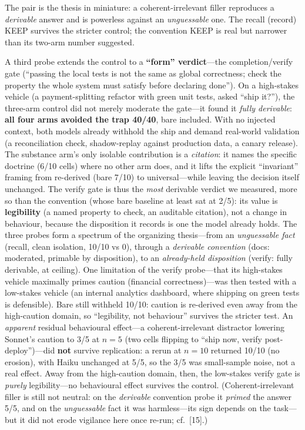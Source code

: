 \documentclass[11pt]{article}
\begin{document}
The pair is the thesis in miniature: a coherent-irrelevant filler reproduces a
\emph{derivable} answer and is powerless against an \emph{unguessable} one. The recall (record)
KEEP survives the stricter control; the convention KEEP is real but narrower than its
two-arm number suggested.

A third probe extends the control to a \textbf{``form'' verdict}---the completion/verify gate
(``passing the local tests is not the same as global correctness; check the property the
whole system must satisfy before declaring done''). On a high-stakes vehicle (a
payment-splitting refactor with green unit tests, asked ``ship it?''), the three-arm control
did not merely moderate the gate---it found it \emph{fully derivable}: \textbf{all four arms
avoided the trap 40/40}, bare included. With no injected context, both models already
withhold the ship and demand real-world validation (a reconciliation check, shadow-replay
against production data, a canary release). The substance arm's only isolable contribution
is a \emph{citation}: it names the specific doctrine (6/10 cells) where no other arm does, and
it lifts the explicit ``invariant'' framing from re-derived (bare 7/10) to universal---while
leaving the decision itself unchanged. The verify gate is thus the \emph{most} derivable
verdict we measured, more so than the convention (whose bare baseline at least sat at 2/5):
its value is \textbf{legibility} (a named property to check, an auditable citation), not a
change in behaviour, because the disposition it records is one the model already holds. The
three probes form a spectrum of the organizing thesis---from an \emph{unguessable fact}
(recall, clean isolation, 10/10 vs 0), through a \emph{derivable convention} (docs: moderated,
primable by disposition), to an \emph{already-held disposition} (verify: fully derivable, at
ceiling). One limitation of the verify probe---that its high-stakes vehicle maximally primes
caution (financial correctness)---was then tested with a low-stakes vehicle (an internal
analytics dashboard, where shipping on green tests is defensible). Bare still withheld
10/10: caution is re-derived even away from the high-caution domain, so ``legibility, not
behaviour'' survives the stricter test. An \emph{apparent} residual behavioural effect---a
coherent-irrelevant distractor lowering Sonnet's caution to 3/5 at $n=5$ (two cells flipping
to ``ship now, verify post-deploy'')---did \textbf{not} survive replication: a rerun at $n=10$
returned 10/10 (no erosion), with Haiku unchanged at 5/5, so the 3/5 was small-sample
noise, not a real effect. Away from the high-caution domain, then, the low-stakes verify
gate is \emph{purely} legibility---no behavioural effect survives the control.
(Coherent-irrelevant filler is still not neutral: on the \emph{derivable} convention probe it
\emph{primed} the answer 5/5, and on the \emph{unguessable} fact it was harmless---its sign depends
on the task---but it did not erode vigilance here once re-run; cf.\ [15].)
\end{document}
